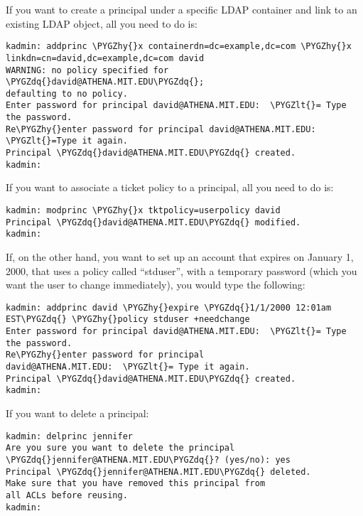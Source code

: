 \documentclass[letterpaper,10pt,english]{sphinxmanual}
\def\PYGZlt{\char`\<}
\def\PYGZhy{\char`\-}
\def\PYGZdq{\char`\"}
\begin{document}
If you want to create a principal under a specific LDAP container and
link to an existing LDAP object, all you need to do is:

\begin{Verbatim}[commandchars=\\\{\}]
kadmin: addprinc \PYGZhy{}x containerdn=dc=example,dc=com \PYGZhy{}x linkdn=cn=david,dc=example,dc=com david
WARNING: no policy specified for \PYGZdq{}david@ATHENA.MIT.EDU\PYGZdq{};
defaulting to no policy.
Enter password for principal david@ATHENA.MIT.EDU:  \PYGZlt{}= Type the password.
Re\PYGZhy{}enter password for principal david@ATHENA.MIT.EDU:  \PYGZlt{}=Type it again.
Principal \PYGZdq{}david@ATHENA.MIT.EDU\PYGZdq{} created.
kadmin:
\end{Verbatim}

If you want to associate a ticket policy to a principal, all you need
to do is:

\begin{Verbatim}[commandchars=\\\{\}]
kadmin: modprinc \PYGZhy{}x tktpolicy=userpolicy david
Principal \PYGZdq{}david@ATHENA.MIT.EDU\PYGZdq{} modified.
kadmin:
\end{Verbatim}

If, on the other hand, you want to set up an account that expires on
January 1, 2000, that uses a policy called ``stduser'', with a temporary
password (which you want the user to change immediately), you would
type the following:

\begin{Verbatim}[commandchars=\\\{\}]
kadmin: addprinc david \PYGZhy{}expire \PYGZdq{}1/1/2000 12:01am EST\PYGZdq{} \PYGZhy{}policy stduser +needchange
Enter password for principal david@ATHENA.MIT.EDU:  \PYGZlt{}= Type the password.
Re\PYGZhy{}enter password for principal
david@ATHENA.MIT.EDU:  \PYGZlt{}= Type it again.
Principal \PYGZdq{}david@ATHENA.MIT.EDU\PYGZdq{} created.
kadmin:
\end{Verbatim}

If you want to delete a principal:

\begin{Verbatim}[commandchars=\\\{\}]
kadmin: delprinc jennifer
Are you sure you want to delete the principal
\PYGZdq{}jennifer@ATHENA.MIT.EDU\PYGZdq{}? (yes/no): yes
Principal \PYGZdq{}jennifer@ATHENA.MIT.EDU\PYGZdq{} deleted.
Make sure that you have removed this principal from
all ACLs before reusing.
kadmin:
\end{Verbatim}
\end{document}
